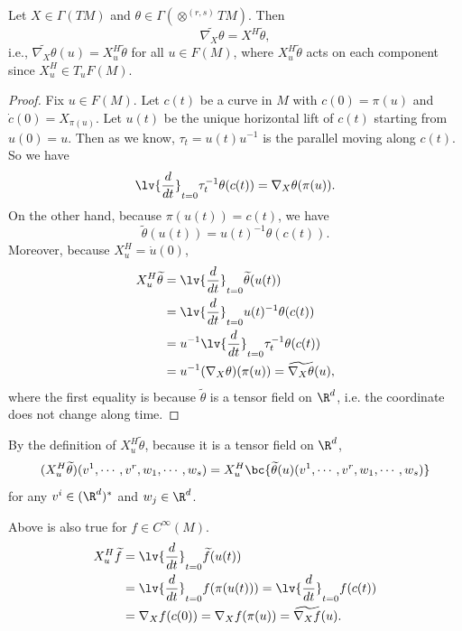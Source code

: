 \begin{prop}
    Let $X \in \Gamma(TM)$ and $\theta \in \Gamma(\otimes^{(r,s)}TM)$. Then
    \begin{equation*}
       \widetilde{\nabla_X \theta} = X^H \widetilde{\theta},
    \end{equation*}
    i.e., $\widetilde{\nabla_X \theta}(u) = X^H_u \widetilde{\theta}$ for all $u \in F(M)$, where $X^H_u \widetilde{\theta}$ acts on each component since $X^H_u \in T_uF(M)$.
\end{prop}
\begin{proof}
    Fix $u \in F(M)$. Let $c(t)$ be a curve in $M$ with $c(0) = \pi(u)$ and $\dot{c}(0) = X_{\pi(u)}$. Let $u(t)$ be the unique horizontal lift of $c(t)$ starting from $u(0) = u$. Then as we know, $\tau_t = u(t)u^{-1}$ is the parallel moving along $c(t)$. So we have
    \begin{equation*}
        \lv{\frac{d}{dt}}_{t = 0} \tau_t^{-1}\theta(c(t)) = \nabla_X \theta(\pi(u)).
    \end{equation*}
    On the other hand, because $\pi(u(t)) = c(t)$, we have
    \begin{equation*}
        \widetilde{\theta}(u(t)) = u(t)^{-1}\theta(c(t)).
    \end{equation*}
    Moreover, because $X^H_u = \dot{u}(0)$,
    \begin{align*}
        X^H_u \widetilde{\theta} &= \lv{\frac{d}{dt}}_{t = 0} \widetilde{\theta}(u(t)) \\
        &= \lv{\frac{d}{dt}}_{t = 0} u(t)^{-1}\theta(c(t)) \\
        &= u^{-1}\lv{\frac{d}{dt}}_{t = 0} \tau_t^{-1}\theta(c(t)) \\
        &= u^{-1} (\nabla_X \theta)(\pi(u)) = \widetilde{\nabla_X \theta}(u),
    \end{align*}
    where the first equality is because $\widetilde{\theta}$ is a tensor field on $\R^d$, i.e. the coordinate does not change along time. \qedhere
\end{proof}
\begin{rmk}
    By the definition of $X^H_u \widetilde{\theta}$, because it is a tensor field on $\R^d$, 
    \begin{equation*}
        (X^H_u \widetilde{\theta})(v^1,\cdots,v^r,w_1,\cdots,w_s) = X^H_u \bc{\widetilde{\theta}(u)(v^1,\cdots,v^r,w_1,\cdots,w_s)}
    \end{equation*}
    for any $v^i \in (\R^d)^*$ and $w_j \in \R^d$.
\end{rmk}
\begin{rmk}
    Above is also true for $f \in C^\infty(M)$.
    \begin{align*}
        X^H_u \widetilde{f} &= \lv{\frac{d}{dt}}_{t = 0} \widetilde{f}(u(t)) \\
        &=  \lv{\frac{d}{dt}}_{t = 0} f(\pi(u(t))) = \lv{\frac{d}{dt}}_{t = 0} f(c(t)) \\
        &= \nabla_X f(c(0)) =  \nabla_X f(\pi(u)) = \widetilde{\nabla_X f}(u).
    \end{align*}
\end{rmk}

